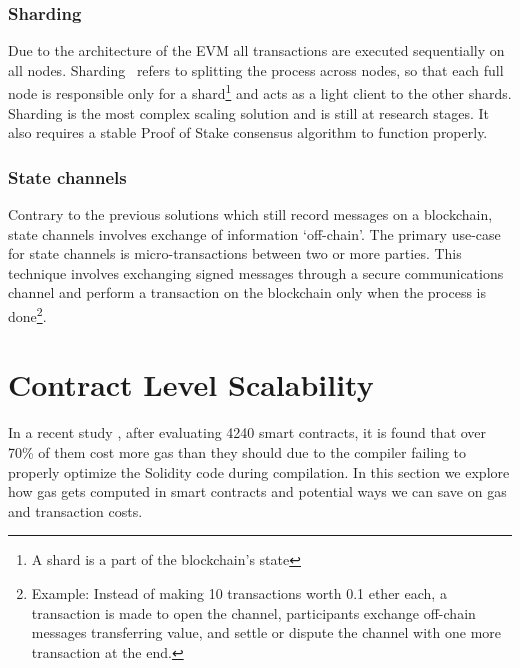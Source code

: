 \subsubsection*{Sharding}
Due to the architecture of the EVM all transactions are executed sequentially on all nodes. Sharding~\cite{sharding} refers to splitting the process across nodes, so that each full node is responsible only for a shard\footnote{A shard is a part of the blockchain's state} and acts as a light client to the other shards. Sharding is the most complex scaling solution and is still at research stages. It also requires a stable Proof of Stake consensus algorithm to function properly.

\subsubsection*{State channels}
Contrary to the previous solutions which still record messages on a blockchain, state channels involves exchange of information `off-chain'. The primary use-case for state channels is micro-transactions between two or more parties. This technique involves exchanging signed messages through a secure communications channel and perform a transaction on the blockchain only when the process is done\footnote{Example: Instead of making 10 transactions worth 0.1 ether each, a transaction is made to open the channel, participants exchange off-chain messages transferring value, and settle or dispute the channel with one more transaction at the end.}.

\section{Contract Level Scalability}
In a recent study \cite{DBLP:journals/corr/ChenLLZ17}, after evaluating 4240 smart contracts, it is found that over 70\% of them cost more gas than they should due to the compiler failing to properly optimize the Solidity code during compilation. In this section we explore how gas gets computed in smart contracts and potential ways we can save on gas and transaction costs.

